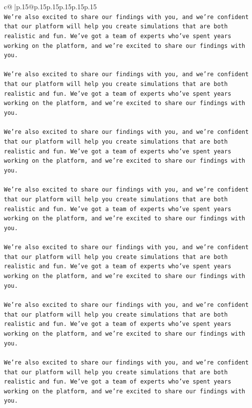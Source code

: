 \documentclass{article}
\begin{document}
{\begin{supertabular}{c@{$\;$}|p{.15\linewidth}@{}p{.15\linewidth}p{.15\linewidth}p{.15\linewidth}p{.15\linewidth}p{.15\linewidth}}
{{{\\ 
\texttt{We're also excited to share our findings with you, and we're confident that our platform will help you create simulations that are both realistic and fun. We've got a team of experts who've spent years working on the platform, and we're excited to share our findings with you.} \\
\\ 
\texttt{We're also excited to share our findings with you, and we're confident that our platform will help you create simulations that are both realistic and fun. We've got a team of experts who've spent years working on the platform, and we're excited to share our findings with you.} \\
\\ 
\texttt{We're also excited to share our findings with you, and we're confident that our platform will help you create simulations that are both realistic and fun. We've got a team of experts who've spent years working on the platform, and we're excited to share our findings with you.} \\
\\ 
\texttt{We're also excited to share our findings with you, and we're confident that our platform will help you create simulations that are both realistic and fun. We've got a team of experts who've spent years working on the platform, and we're excited to share our findings with you.} \\
\\ 
\texttt{We're also excited to share our findings with you, and we're confident that our platform will help you create simulations that are both realistic and fun. We've got a team of experts who've spent years working on the platform, and we're excited to share our findings with you.} \\
\\ 
\texttt{We're also excited to share our findings with you, and we're confident that our platform will help you create simulations that are both realistic and fun. We've got a team of experts who've spent years working on the platform, and we're excited to share our findings with you.} \\
\\ 
\texttt{We're also excited to share our findings with you, and we're confident that our platform will help you create simulations that are both realistic and fun. We've got a team of experts who've spent years working on the platform, and we're excited to share our findings with you.} \\
}}}
\end{supertabular}}
\end{document}
